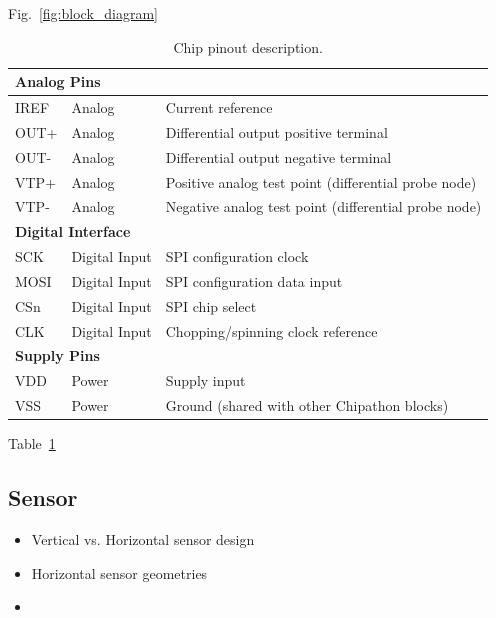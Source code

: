 \documentclass{article}
\begin{document}
Fig.~\ref{fig:block_diagram}

\begin{table}[htbp]
\centering
\caption{Chip pinout description.}
\label{tab:pinout}

\begin{tabular}{p{2.2cm} p{2.5cm} p{8.0cm}}
\toprule

\multicolumn{3}{l}{\textbf{Analog Pins}} \\
\midrule
IREF   & Analog & Current reference \\
OUT+   & Analog & Differential output positive terminal \\
OUT-   & Analog & Differential output negative terminal \\
VTP+   & Analog & Positive analog test point (differential probe node) \\
VTP-   & Analog & Negative analog test point (differential probe node) \\
\midrule

\multicolumn{3}{l}{\textbf{Digital Interface}} \\
\midrule
SCK    & Digital Input & SPI configuration clock \\
MOSI   & Digital Input & SPI configuration data input \\
CSn    & Digital Input & SPI chip select \\
CLK    & Digital Input & Chopping/spinning clock reference \\
\midrule

\multicolumn{3}{l}{\textbf{Supply Pins}} \\
\midrule
VDD    & Power & Supply input \\
VSS    & Power & Ground (shared with other Chipathon blocks) \\
\bottomrule

\end{tabular}
\end{table}

Table~\ref{tab:pinout}

\subsection{Sensor}

\begin{itemize}
    \item Vertical vs. Horizontal sensor design
    \item Horizontal sensor geometries
    \item 
\end{itemize}
\end{document}
